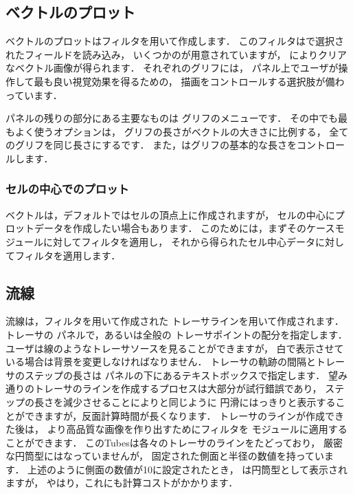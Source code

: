 \subsection{ベクトルのプロット}
\label{ssec:6.1.7}
ベクトルのプロットはフィルタを用いて作成します．
このフィルタはで選択されたフィールドを読み込み，
いくつかのが用意されていますが，
によりクリアなベクトル画像が得られます．
それぞれのグリフには，
パネル上でユーザが操作して最も良い視覚効果を得るための，
描画をコントロールする選択肢が備わっています．

パネルの残りの部分にある主要なものは
グリフのメニューです．
その中でも最もよく使うオプションは，
グリフの長さがベクトルの大きさに比例する，
全てのグリフを同じ長さにするです．
また，はグリフの基本的な長さをコントロールします．

\subsubsection{セルの中心でのプロット}
\label{sssec:6.1.7.1}
ベクトルは，デフォルトではセルの頂点上に作成されますが，
セルの中心にプロットデータを作成したい場合もあります．
このためには，まずそのケースモジュールに対してフィルタを適用し，
それから得られたセル中心データに対してフィルタを適用します．

\subsection{流線}
\label{ssec:6.1.8}
流線は，フィルタを用いて作成された
トレーサラインを用いて作成されます．
トレーサの
%
%
パネルで，あるいは全般の
トレーサポイントの配分を指定します．
ユーザは線のようなトレーサソースを見ることができますが，
白で表示させている場合は背景を変更しなければなりません．
トレーサの軌跡の間隔とトレーサのステップの長さは
パネルの下にあるテキストボックスで指定します．
望み通りのトレーサのラインを作成するプロセスは大部分が試行錯誤であり，
ステップの長さを減少させることによりと同じように
円滑にはっきりと表示することができますが，反面計算時間が長くなります．
トレーサのラインが作成できた後は，
より高品質な画像を作り出すためにフィルタを
モジュールに適用することができます．
このTubesは各々のトレーサのラインをたどっており，
厳密な円筒型にはなっていませんが，
固定された側面と半径の数値を持っています．
上述のように側面の数値が10に設定されたとき，
は円筒型として表示されますが，
やはり，これにも計算コストがかかります．


